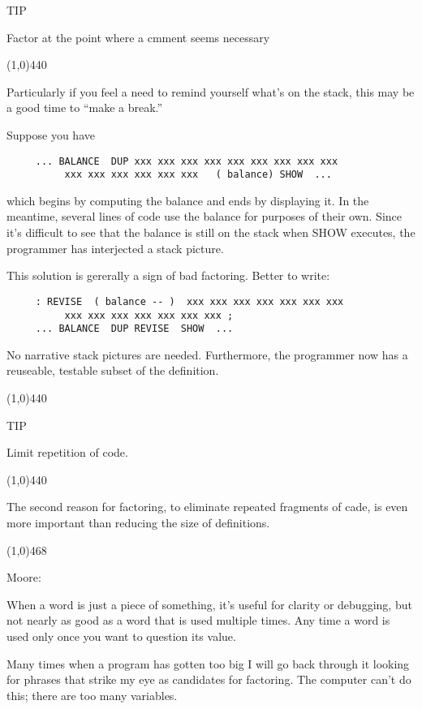 \documentclass{book}
\begin{document}
TIP 

Factor at the point where a cmment seems necessary

\line(1,0){440}

\bigskip

\noindent
Particularly if you feel a need to remind yourself what's on the stack, this may be a good time to ``make a break.''

Suppose you have

\begin{verbatim}
     ... BALANCE  DUP xxx xxx xxx xxx xxx xxx xxx xxx xxx
          xxx xxx xxx xxx xxx xxx   ( balance) SHOW  ...
\end{verbatim}

\noindent
which begins by computing the balance and ends by displaying it. In the meantime, several lines of code use the balance for purposes of their own. Since it's difficult to see that the balance is still on the stack when SHOW executes, the programmer has interjected a stack picture.

This solution is gererally a sign of bad factoring. Better to write:

\begin{verbatim}
     : REVISE  ( balance -- )  xxx xxx xxx xxx xxx xxx xxx
          xxx xxx xxx xxx xxx xxx xxx ;
     ... BALANCE  DUP REVISE  SHOW  ...
\end{verbatim}

\noindent
No narrative stack pictures are needed. Furthermore, the programmer now has a reuseable, testable subset of the definition.

\line(1,0){440}

TIP

Limit repetition of code.

\line(1,0){440}

\bigskip

\noindent
The second reason for factoring, to eliminate repeated fragments of cade, is even more important than reducing the size of definitions.

\noindent
\line(1,0){468}

\noindent
Moore:

\begin{list}{}{}

\item
When a word is just a piece of something, it's useful for clarity or debugging, but not nearly as good as a word that is used multiple times. Any time a word is used only once you want to question its value.

\item
Many times when a program has gotten too big I will go back through it looking for phrases that strike my eye as candidates for factoring. The computer can't do this; there are too many variables.

\end{list}{}{}
\end{document}

